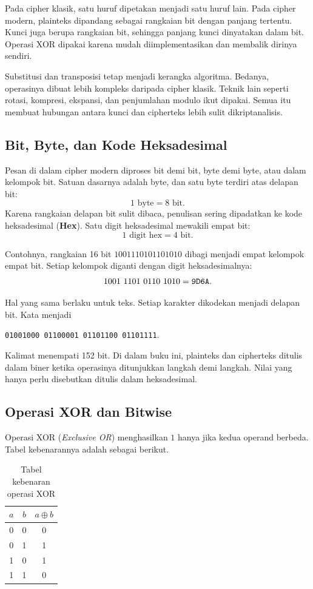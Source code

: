 Pada cipher klasik, satu huruf dipetakan menjadi satu huruf lain. Pada cipher
modern, plainteks dipandang sebagai rangkaian bit dengan panjang tertentu.
Kunci juga berupa rangkaian bit, sehingga panjang kunci dinyatakan dalam bit.
Operasi XOR dipakai karena mudah diimplementasikan dan membalik dirinya sendiri.

Substitusi dan transposisi tetap menjadi kerangka algoritma. Bedanya, operasinya
dibuat lebih kompleks daripada cipher klasik. Teknik lain seperti rotasi,
kompresi, ekspansi, dan penjumlahan modulo ikut dipakai. Semua itu membuat
hubungan antara kunci dan cipherteks lebih sulit dikriptanalisis.

\subsection{Bit, Byte, dan Kode Heksadesimal}

Pesan di dalam cipher modern diproses bit demi bit, byte demi byte, atau dalam
kelompok bit. Satuan dasarnya adalah byte, dan satu byte terdiri atas delapan
bit:
\[
1 \text{ byte} = 8 \text{ bit}.
\]
Karena rangkaian delapan bit sulit dibaca, penulisan sering dipadatkan ke kode
heksadesimal (\textbf{Hex}). Satu digit heksadesimal mewakili empat bit:
\[
1 \text{ digit hex} = 4 \text{ bit}.
\]

Contohnya, rangkaian 16 bit $1001110101101010$ dibagi menjadi empat kelompok
empat bit. Setiap kelompok diganti dengan digit heksadesimalnya:
\[
1001\ 1101\ 0110\ 1010 = \code{9D6A}.
\]

Hal yang sama berlaku untuk teks. Setiap karakter dikodekan menjadi delapan
bit. Kata  menjadi
\begin{center}
\texttt{01001000 01100001 01101100 01101111}.
\end{center}
Kalimat  menempati 152 bit. Di dalam buku ini,
plainteks dan cipherteks ditulis dalam biner ketika operasinya ditunjukkan
langkah demi langkah. Nilai yang hanya perlu disebutkan ditulis dalam
heksadesimal.

\subsection{Operasi XOR dan Bitwise}

Operasi XOR (\textit{Exclusive OR}) menghasilkan $1$ hanya jika kedua operand
berbeda. Tabel kebenarannya adalah sebagai berikut.

\begin{table}[htbp]
    \centering
    \caption{Tabel kebenaran operasi XOR}
    \label{tab:kebenaran-xor}
    \begin{tabular}{|c|c|c|}
    \hline
    $a$ & $b$ & $a \oplus b$ \\
    \hline
    0 & 0 & 0 \\
    0 & 1 & 1 \\
    1 & 0 & 1 \\
    1 & 1 & 0 \\
    \hline
    \end{tabular}
\end{table}

